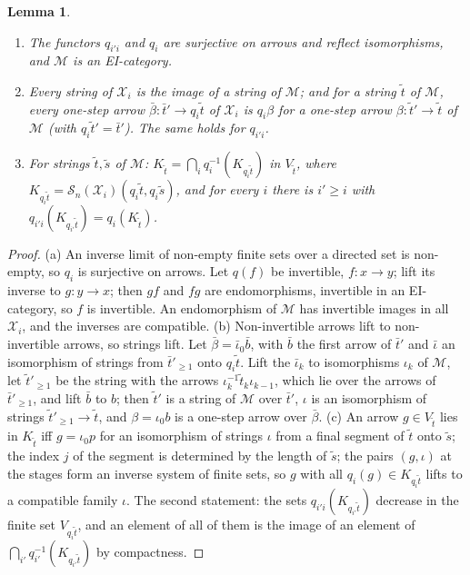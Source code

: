 \documentclass[11pt]{amsart}
\newtheorem{lem}[thm]{Lemma}
\theoremstyle{definition}
\newcommand{\cX}{\mathcal X}
\newcommand{\cM}{\mathcal M}
\newcommand{\cS}{\mathcal S}
\begin{document}
\begin{lem}\label{lem:tower}
\begin{enumerate}
\item[(a)] The functors $q_{i'i}$ and $q_i$ are surjective on arrows
and reflect isomorphisms, and $\cM$ is an EI-category.
\item[(b)] Every string of
$\cX_i$ is the image of a string of $\cM$; and for a string $\tilde t$
of $\cM$, every one-step arrow $\bar\beta\colon\bar t'\to q_i\tilde t$
of $\cX_i$ is $q_i\beta$ for a one-step arrow $\beta\colon\tilde t'\to
\tilde t$ of $\cM$ (with $q_i\tilde t'=\bar t'$). The same holds for
$q_{i'i}$.
\item[(c)] For strings $\tilde t,\tilde s$ of $\cM$:
$K_{\tilde t}=\bigcap_iq_i^{-1}(K_{q_i\tilde t})$ in $V_{\tilde t}$,
where $K_{q_i\tilde t}=\cS_n(\cX_i)(q_i\tilde t,q_i\tilde s)$, and for
every $i$ there is $i'\ge i$ with $q_{i'i}(K_{q_{i'}\tilde t})=
q_i(K_{\tilde t})$.
\end{enumerate}
\end{lem}
\begin{proof}
(a) An inverse limit of non-empty finite sets over a directed set is
non-empty, so $q_i$ is surjective on arrows. Let $q(f)$ be invertible,
$f\colon x\to y$; lift its inverse to $g\colon y\to x$; then $gf$ and
$fg$ are endomorphisms, invertible in an EI-category, so $f$ is
invertible. An endomorphism of $\cM$ has invertible images in all
$\cX_i$, and the inverses are compatible. (b) Non-invertible arrows
lift to non-invertible arrows, so strings lift. Let $\bar\beta=
\bar\iota_0\bar b$, with $\bar b$ the first arrow of $\bar t'$ and
$\bar\iota$ an isomorphism of strings from $\bar t'_{\ge1}$ onto
$q_i\tilde t$. Lift the $\bar\iota_k$ to isomorphisms $\iota_k$ of
$\cM$, let $\tilde t'_{\ge1}$ be the string with the arrows
$\iota_k^{-1}\tilde t_k\iota_{k-1}$, which lie over the arrows of
$\bar t'_{\ge1}$, and lift $\bar b$ to $b$; then $\tilde t'$ is a
string of $\cM$ over $\bar t'$, $\iota$ is an isomorphism of strings
$\tilde t'_{\ge1}\to\tilde t$, and $\beta=\iota_0b$ is a one-step arrow
over $\bar\beta$. (c) An arrow $g\in V_{\tilde t}$ lies in
$K_{\tilde t}$ iff $g=\iota_0p$ for an isomorphism of strings $\iota$
from a final segment of $\tilde t$ onto $\tilde s$; the index $j$ of
the segment is determined by the length of $\tilde s$; the pairs
$(g,\iota)$ at the stages form an inverse system of finite sets, so
$g$ with all $q_i(g)\in K_{q_i\tilde t}$ lifts to a compatible family
$\iota$. The second statement: the sets $q_{i'i}(K_{q_{i'}\tilde t})$
decrease in the finite set $V_{q_i\tilde t}$, and an element of all of
them is the image of an element of $\bigcap_{i'}q_{i'}^{-1}(K_{q_{i'}
\tilde t})$ by compactness.
\end{proof}
\end{document}

